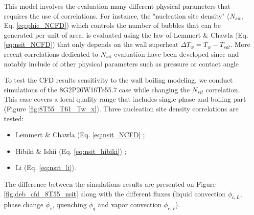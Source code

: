 \npar

This model involves the evaluation many different physical parameters that requires the use of correlations. For instance, the "nucleation site density" ($N_{sit}$, Eq. \ref{eq:phie_NCFD}) which controls the number of bubbles that can be generated per unit of area, is evaluated using the law of Lemmert \& Chawla \cite{lemmert_influence_1977} (Eq. \ref{eq:nsit_NCFD}) that only depends on the wall superheat $\Delta T_{w} = T_{w}-T_{sat}$. More recent correlations dedicated to $N_{sit}$ evaluation have been developed since and notably include of other physical parameters such as pressure or contact angle \cite{hibiki_active_2003, li_development_2018, zhou_experimental_2020, basu_wall_2005}

\npar

To test the CFD results sensitivity to the wall boiling modeling, we conduct simulations of the 8G2P26W16Te55.7 case while changing the $N_{sit}$ correlation. This case covers a local quality range that includes single phase and boiling part (Figure \ref{fig:8T55_T61_Tw_x}). Three nucleation site density correlations are tested:

\begin{itemize}
\item Lemmert \& Chawla \cite{lemmert_influence_1977} (Eq. \ref{eq:nsit_NCFD} ;
\item Hibiki \& Ishii \cite{hibiki_active_2003} (Eq. \ref{eq:nsit_hibiki}) ;
\item Li \etal \cite{li_development_2018} (Eq. \ref{eq:nsit_li}).
\end{itemize}

The difference between the simulations results are presented on Figure \ref{fig:deb_cfd_8T55_nsit} along with the different fluxes (liquid convection $\phi_{c,L}$, phase change $\phi_{e}$, quenching $\phi_{q}$ and vapor convection $\phi_{c,V}$). 


